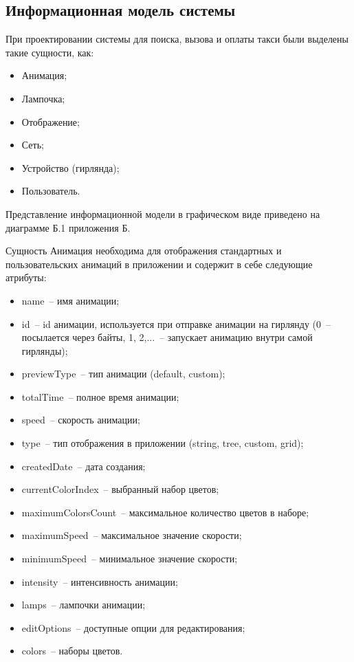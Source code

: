 \newpage
\subsection{Информационная модель системы}
\label{sec:develop:umlDiagrams}

При проектировании системы для поиска, вызова и оплаты такси были выделены такие сущности, как:
\begin{itemize}
	\item Анимация;
	\item Лампочка;
	\item Отображение;
	\item Сеть;
	\item Устройство (гирлянда);
	\item Пользователь.
\end{itemize}

Представление информационной модели в графическом виде приведено на диаграмме Б.1 приложения Б. 

Сущность Анимация необходима для отображения стандартных и пользовательских анимаций в приложении и содержит в себе следующие атрибуты:
\begin{itemize}
	\item name~-- имя анимации;
	\item id~-- id анимации, используется при отправке анимации на гирлянду (0~-- посылается через байты, 1, 2,...~-- запускает анимацию внутри самой гирлянды);
	\item previewType~-- тип анимации (default, custom);
	\item totalTime~-- полное время анимации;
	\item speed~-- скорость анимации;
	\item type~-- тип отображения в приложении (string, tree, custom, grid);
	\item createdDate~-- дата создания;
	\item currentColorIndex~-- выбранный набор цветов;
	\item maximumColorsCount~-- максимальное количество цветов в наборе;
	\item maximumSpeed~-- максимальное значение скорости;
	\item minimumSpeed~-- минимальное значение скорости;
	\item intensity~-- интенсивность анимации;
	\item lamps~-- лампочки анимации;
	\item editOptions~-- доступные опции для редактирования;
	\item colors~-- наборы цветов.
\end{itemize}

